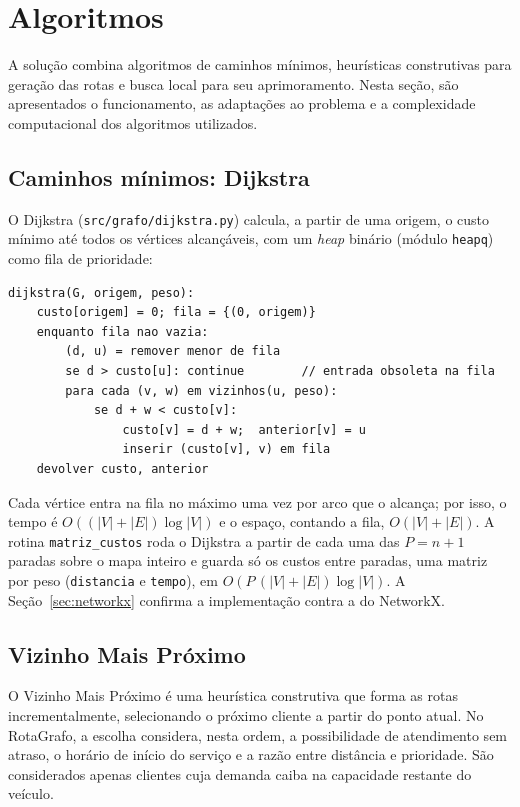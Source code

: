 \documentclass[12pt]{article}
\begin{document}
\section{Algoritmos}\label{sec:algoritmos}

A solução combina algoritmos de caminhos mínimos, heurísticas construtivas para geração
das rotas e busca local para seu aprimoramento. Nesta seção, são apresentados o
funcionamento, as adaptações ao problema e a complexidade computacional dos algoritmos
utilizados.

\subsection{Caminhos mínimos: Dijkstra}

O Dijkstra (\texttt{src/grafo/dijkstra.py}) calcula, a partir de uma origem, o custo
mínimo até todos os vértices alcançáveis, com um \textit{heap} binário (módulo
\texttt{heapq}) como fila de prioridade:

\begin{lstlisting}
dijkstra(G, origem, peso):
    custo[origem] = 0; fila = {(0, origem)}
    enquanto fila nao vazia:
        (d, u) = remover menor de fila
        se d > custo[u]: continue        // entrada obsoleta na fila
        para cada (v, w) em vizinhos(u, peso):
            se d + w < custo[v]:
                custo[v] = d + w;  anterior[v] = u
                inserir (custo[v], v) em fila
    devolver custo, anterior
\end{lstlisting}

Cada vértice entra na fila no máximo uma vez por arco que o alcança; por isso, o tempo
é $O((|V| + |E|)\log |V|)$ e o espaço, contando a fila, $O(|V| + |E|)$. A rotina
\texttt{matriz\_custos} roda o Dijkstra a partir de cada uma das $P = n + 1$ paradas
sobre o mapa inteiro e guarda só os custos entre paradas, uma matriz por peso
(\texttt{distancia} e \texttt{tempo}), em $O(P\,(|V| + |E|)\log |V|)$. A
Seção~\ref{sec:networkx} confirma a implementação contra a do NetworkX.

\subsection{Vizinho Mais Próximo}

O Vizinho Mais Próximo é uma heurística construtiva que forma as rotas
incrementalmente, selecionando o próximo cliente a partir do ponto atual. No
RotaGrafo, a escolha considera, nesta ordem, a possibilidade de atendimento sem
atraso, o horário de início do serviço e a razão entre distância e prioridade. São
considerados apenas clientes cuja demanda caiba na capacidade restante do veículo.
\end{document}
